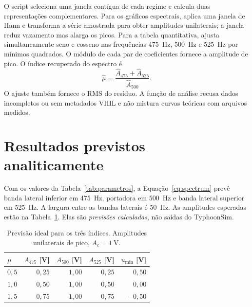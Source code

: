 \documentclass[11pt,a4paper]{article}
\newcommand{\arquivo}[1]{\texttt{\detokenize{#1}}}
\begin{document}
O script \arquivo{analisar_captura.py} seleciona uma janela contígua de cada regime e calcula duas representações complementares. Para os gráficos espectrais, aplica uma janela de Hann e transforma a série amostrada para obter amplitudes unilaterais; a janela reduz vazamento mas alarga os picos. Para a tabela quantitativa, ajusta simultaneamente seno e cosseno nas frequências \SI{475}{\hertz}, \SI{500}{\hertz} e \SI{525}{\hertz} por mínimos quadrados. O módulo de cada par de coeficientes fornece a amplitude de pico. O índice recuperado do espectro é
\begin{equation}
 \widehat\mu=\frac{\widehat A_{475}+\widehat A_{525}}{\widehat A_{500}}.
 \label{eq:mu_est}
\end{equation}
O ajuste também fornece o RMS do resíduo. A função de análise recusa dados incompletos ou sem metadados VHIL e não mistura curvas teóricas com arquivos medidos.

\section{Resultados previstos analiticamente}
Com os valores da Tabela~\ref{tab:parametros}, a Equação~\eqref{eq:spectrum} prevê banda lateral inferior em \SI{475}{\hertz}, portadora em \SI{500}{\hertz} e banda lateral superior em \SI{525}{\hertz}. A largura entre as bandas laterais é \SI{50}{\hertz}. As amplitudes esperadas estão na Tabela~\ref{tab:teoria}. Elas são \emph{previsões calculadas}, não saídas do TyphoonSim.

\begin{table}[htbp]
\centering
\caption{Previsão ideal para os três índices. Amplitudes unilaterais de pico, $A_c=\SI{1}{\volt}$.}
\label{tab:teoria}
\begin{tabular}{@{}lrrrr@{}}
\toprule
$\mu$ & $A_{475}$ [V] & $A_{500}$ [V] & $A_{525}$ [V] & $u_{\min}$ [V]\\
\midrule
$0{,}5$ & $0{,}25$ & $1{,}00$ & $0{,}25$ & $0{,}50$\\
$1{,}0$ & $0{,}50$ & $1{,}00$ & $0{,}50$ & $0{,}00$\\
$1{,}5$ & $0{,}75$ & $1{,}00$ & $0{,}75$ & $-0{,}50$\\
\bottomrule
\end{tabular}
\end{table}
\end{document}
